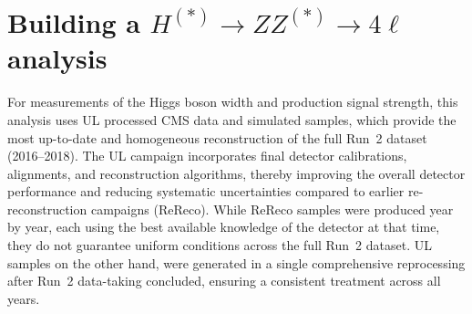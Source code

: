 


\section{Building a $H^{(*)} \to ZZ^{(*)} \to 4\ell$ analysis} \label{sec:UL}

For measurements of the Higgs boson width and production signal strength, this analysis uses UL processed CMS data and simulated samples, which provide the most up-to-date and homogeneous reconstruction of the full Run~2 dataset (2016--2018). The UL campaign incorporates final detector calibrations, alignments, and reconstruction algorithms, thereby improving the overall detector performance and reducing systematic uncertainties compared to earlier re-reconstruction campaigns (ReReco). While ReReco samples were produced year by year, each using the best available knowledge of the detector at that time, they do not guarantee uniform conditions across the full Run~2 dataset. UL samples on the other hand, were generated in a single comprehensive reprocessing after Run~2 data-taking concluded, ensuring a consistent treatment across all years. 

